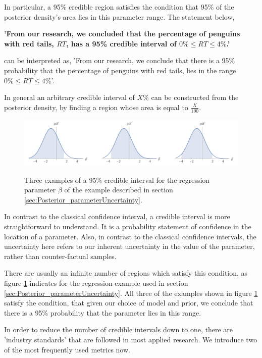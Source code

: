 \documentclass[11pt,fullpage]{book}
\begin{document}
In particular, a 95\% credible region satisfies the condition that 95\% of the posterior density's area lies in this parameter range. The statement below,

\textbf{'From our research, we concluded that the percentage of penguins with red tails, $RT$, has a 95\% credible interval of $0\%\leq RT \leq 4\%$.'}

can be interpreted as, 'From our research, we conclude that there is a 95\% probability that the percentage of penguins with red tails, lies in the range $0\%\leq RT \leq 4\%$'.

In general an arbitrary credible interval of $X$\% can be constructed from the posterior density, by finding a region whose area is equal to $\frac{X}{100}$. 

\begin{figure}
\centering
\scalebox{0.35} 
{\includegraphics{Posterior_infiniteCredibleIntervals.pdf}}
\caption{Three examples of a 95\% credible interval for the regression parameter $\beta$ of the example described in section \ref{sec:Posterior_parameterUncertainty}.}\label{fig:Posterior_infiniteCredibleIntervals}
\end{figure}

In contrast to the classical confidence interval, a credible interval is more straightforward to understand. It is a probability statement of confidence in the location of a parameter. Also, in contrast to the classical confidence intervals, the uncertainty here refers to our inherent uncertainty in the value of the parameter, rather than counter-factual samples.

There are usually an infinite number of regions which satisfy this condition, as figure \ref{fig:Posterior_infiniteCredibleIntervals} indicates for the regression example used in section \ref{sec:Posterior_parameterUncertainty}. All three of the examples shown in figure \ref{fig:Posterior_infiniteCredibleIntervals} satisfy the condition, that given our choice of model and prior, we conclude that there is a 95\% probability that the parameter lies in this range. 

In order to reduce the number of credible intervals down to one, there are 'industry standards' that are followed in most applied research. We introduce two of the most frequently used metrics now.
\end{document}
